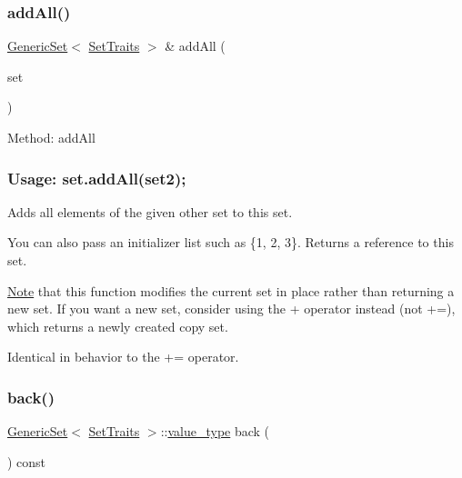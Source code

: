 \subsubsection{\texorpdfstring{add\+All()}{addAll()}}
{\footnotesize\ttfamily \mbox{\hyperlink{classstanfordcpplib_1_1collections_1_1GenericSet}{Generic\+Set}}$<$ \mbox{\hyperlink{structstanfordcpplib_1_1collections_1_1SetTraits}{Set\+Traits}} $>$ \& add\+All (\begin{DoxyParamCaption}\item[{const \mbox{\hyperlink{classstanfordcpplib_1_1collections_1_1GenericSet}{Generic\+Set}}$<$ \mbox{\hyperlink{structstanfordcpplib_1_1collections_1_1SetTraits}{Set\+Traits}} $>$ \&}]{set }\end{DoxyParamCaption})}



Method\+: add\+All \subsubsection*{Usage\+: set.\+add\+All(set2); }

Adds all elements of the given other set to this set. 

You can also pass an initializer list such as \{1, 2, 3\}. Returns a reference to this set.

\mbox{\hyperlink{classNote}{Note}} that this function modifies the current set in place rather than returning a new set. If you want a new set, consider using the + operator instead (not +=), which returns a newly created copy set.

Identical in behavior to the += operator. \mbox{\label{classstanfordcpplib_1_1collections_1_1GenericSet_a4b351b4cfc065bb0eee5d8c7404c3147}} 
\subsubsection{\texorpdfstring{back()}{back()}}
{\footnotesize\ttfamily \mbox{\hyperlink{classstanfordcpplib_1_1collections_1_1GenericSet}{Generic\+Set}}$<$ \mbox{\hyperlink{structstanfordcpplib_1_1collections_1_1SetTraits}{Set\+Traits}} $>$\+::\mbox{\hyperlink{classstanfordcpplib_1_1collections_1_1GenericSet_a669c81f158766925e7293f97c0099b28}{value\+\_\+type}} back (\begin{DoxyParamCaption}{ }\end{DoxyParamCaption}) const}



